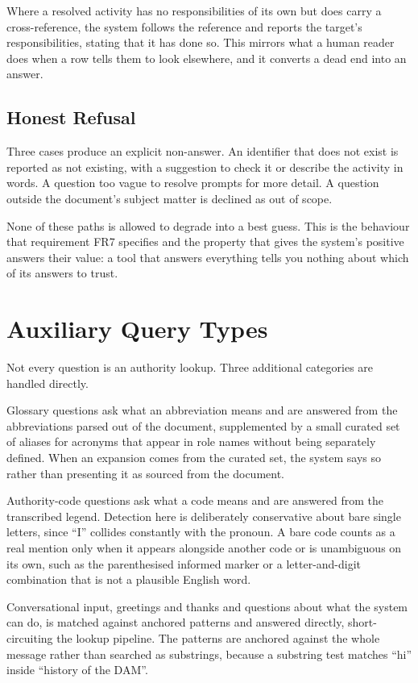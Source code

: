 Where a resolved activity has no responsibilities of its own but does carry a cross-reference, the system follows the reference and reports the target's responsibilities, stating that it has done so. This mirrors what a human reader does when a row tells them to look elsewhere, and it converts a dead end into an answer.

\subsection{Honest Refusal}

Three cases produce an explicit non-answer. An identifier that does not exist is reported as not existing, with a suggestion to check it or describe the activity in words. A question too vague to resolve prompts for more detail. A question outside the document's subject matter is declined as out of scope.

None of these paths is allowed to degrade into a best guess. This is the behaviour that requirement FR7 specifies and the property that gives the system's positive answers their value: a tool that answers everything tells you nothing about which of its answers to trust.

\section{Auxiliary Query Types}

Not every question is an authority lookup. Three additional categories are handled directly.

Glossary questions ask what an abbreviation means and are answered from the abbreviations parsed out of the document, supplemented by a small curated set of aliases for acronyms that appear in role names without being separately defined. When an expansion comes from the curated set, the system says so rather than presenting it as sourced from the document.

Authority-code questions ask what a code means and are answered from the transcribed legend. Detection here is deliberately conservative about bare single letters, since ``I'' collides constantly with the pronoun. A bare code counts as a real mention only when it appears alongside another code or is unambiguous on its own, such as the parenthesised informed marker or a letter-and-digit combination that is not a plausible English word.

Conversational input, greetings and thanks and questions about what the system can do, is matched against anchored patterns and answered directly, short-circuiting the lookup pipeline. The patterns are anchored against the whole message rather than searched as substrings, because a substring test matches ``hi'' inside ``history of the DAM''.

